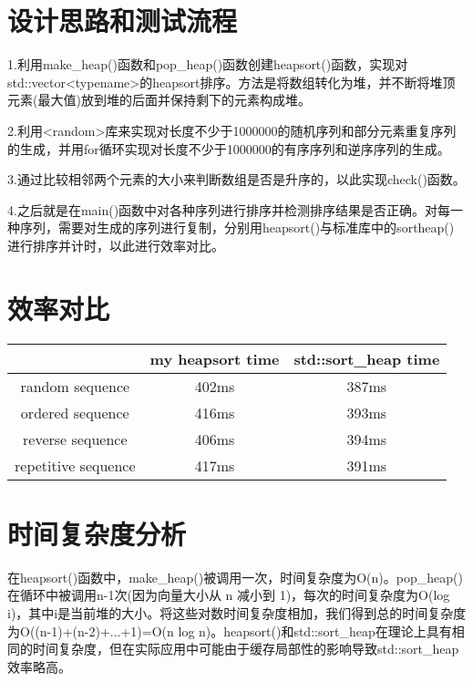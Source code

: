 \documentclass[UTF8]{ctexart}
\begin{document}
\pagestyle{fancy}
\fancyhead{}

\section{设计思路和测试流程}

1.利用make\_heap()函数和pop\_heap()函数创建heapsort()函数，实现对std::vector<typename>的heapsort排序。方法是将数组转化为堆，并不断将堆顶元素(最大值)放到堆的后面并保持剩下的元素构成堆。

2.利用<random>库来实现对长度不少于1000000的随机序列和部分元素重复序列的生成，并用for循环实现对长度不少于1000000的有序序列和逆序序列的生成。

3.通过比较相邻两个元素的大小来判断数组是否是升序的，以此实现check()函数。

4.之后就是在main()函数中对各种序列进行排序并检测排序结果是否正确。对每一种序列，需要对生成的序列进行复制，分别用heapsort()与标准库中的sortheap()进行排序并计时，以此进行效率对比。

\section{效率对比}

\begin{center}
\begin{tabular}{|c|c|c|}
	\hline
	  &  my heapsort time  &  std::sort\_heap time \\ \hline
	random sequence  &  402ms  &  387ms \\ \hline
	ordered sequence  &  416ms  &  393ms \\ \hline
	reverse sequence  &  406ms  &  394ms \\ \hline
	repetitive sequence  &  417ms  &  391ms \\ \hline
\end{tabular}
\end{center}

\section{时间复杂度分析}

在heapsort()函数中，make\_heap()被调用一次，时间复杂度为O(n)。pop\_heap()在循环中被调用n-1次(因为向量大小从 n 减小到 1)，每次的时间复杂度为O(log i)，其中i是当前堆的大小。将这些对数时间复杂度相加，我们得到总的时间复杂度为O((n-1)+(n-2)+...+1)=O(n log n)。heapsort()和std::sort\_heap在理论上具有相同的时间复杂度，但在实际应用中可能由于缓存局部性的影响导致std::sort\_heap效率略高。
\end{document}
